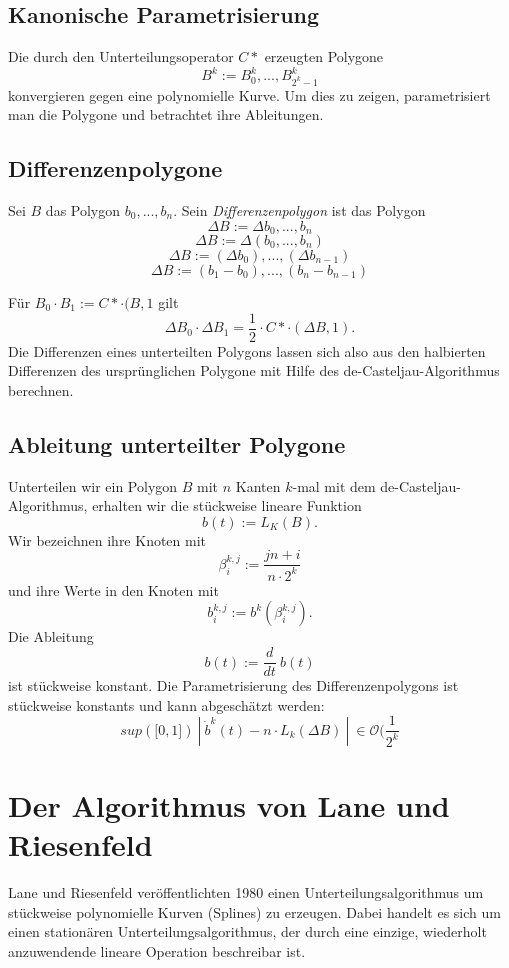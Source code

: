 \subsection{Kanonische Parametrisierung}
Die durch den Unterteilungsoperator \(C*\) erzeugten Polygone
\[B^k := B_0^k,...,B_{2^k-1}^k\]
konvergieren gegen eine polynomielle Kurve. Um dies zu zeigen, parametrisiert man die Polygone und betrachtet ihre Ableitungen.


\subsection{Differenzenpolygone}
Sei \(B\) das Polygon \(b_0,...,b_n\). Sein \textit{Differenzenpolygon} ist das Polygon
\[\Delta B := \Delta b_0,...,b_n\]
\[\Delta B := \Delta(b_0,...,b_n)\]
\[\Delta B := (\Delta b_0),...,(\Delta b_{n-1})\]
\[\Delta B := (b_1-b_0),...,(b_n-b_{n-1})\]

Für \(B_0\cdot B_1 := C*\cdot(B,1\) gilt
\[\Delta B_0\cdot \Delta B_1 = \frac{1}{2}\cdot C* \cdot(\Delta B,1).\]
Die Differenzen eines unterteilten Polygons lassen sich also aus den halbierten Differenzen des ursprünglichen Polygone mit Hilfe des de-Casteljau-Algorithmus berechnen.


\subsection{Ableitung unterteilter Polygone}
Unterteilen wir ein Polygon \(B\) mit \(n\) Kanten \(k\)-mal mit dem de-Casteljau-Algorithmus, erhalten wir die stückweise lineare Funktion
\[b(t) := L_K(B).\]
Wir bezeichnen ihre Knoten mit
\[\beta_i^{k,j} := \frac{jn+i}{n\cdot 2^k}\]
und ihre Werte in den Knoten mit
\[b_i^{k,j} := b^k(\beta_i^{k,j}).\]
Die Ableitung
\[b(t) := \frac{d}{dt}~b(t)\]
ist stückweise konstant. Die Parametrisierung des Differenzenpolygons ist stückweise konstants und kann abgeschätzt werden:
\[sup(\lbrack0,1\rbrack)~|~\dot{b}^k(t)-n\cdot L_k(\Delta B)~|~\in \mathcal{O}(\frac{1}{2^k}\]




\section{Der Algorithmus von Lane und Riesenfeld}
Lane und Riesenfeld veröffentlichten 1980 einen Unterteilungsalgorithmus um stückweise polynomielle Kurven (Splines) zu erzeugen. Dabei handelt es sich um einen stationären Unterteilungsalgorithmus, der durch eine einzige, wiederholt anzuwendende lineare Operation beschreibar ist.

